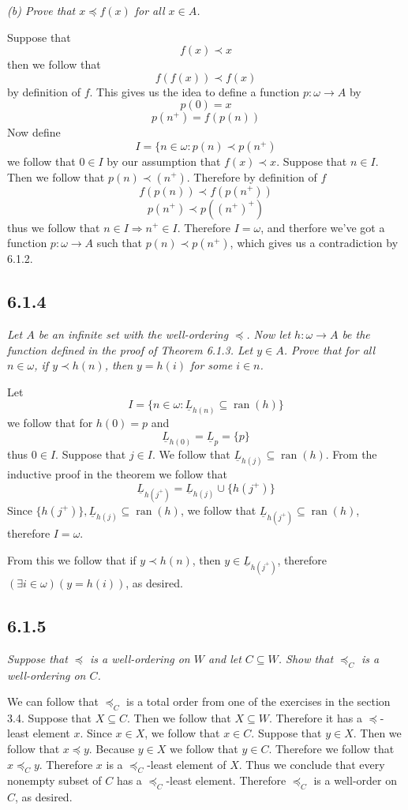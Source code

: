 \documentclass[11pt,oneside,titlepage]{book}
\DeclareMathOperator \ra {\Rightarrow}
\DeclareMathOperator \ran {ran}
\begin{document}
\textit{(b) Prove that $x \preceq f(x)$ for all $x \in A$.}

Suppose that
$$f(x) \prec x$$
then we follow that
$$f(f(x)) \prec f(x)$$
by definition of $f$. This gives us the idea to define a function $p: \omega \to A$ by
$$p(0) = x$$
$$p(n^+) = f(p(n))$$
Now define
$$I = \{n \in \omega: p(n) \prec p(n^+)$$
we follow that $0 \in I$ by our assumption that $f(x) \prec x$. Suppose that
$n \in I$. Then we follow that $p(n) \prec(n^+)$. Therefore by definition of
$f$
$$f(p(n)) \prec f(p(n^+))$$
$$p(n^+) \prec p((n^+)^+)$$
thus we follow that $n \in I \ra n^+ \in I$. Therefore $I = \omega$, and therfore
we've got a function $p: \omega \to A$ such that $p(n) \prec p(n^+)$, which
gives us a contradiction by 6.1.2.

\subsection*{6.1.4}

\textit{Let $A$ be an infinite set with the well-ordering $\preceq$. Now let
  $h: \omega \to A$ be the function defined in the proof of Theorem 6.1.3. Let $y \in A$.
  Prove that for all $n \in \omega$, if $y \prec h(n)$, then $y = h(i)$ for
  some $i \in n$.}

Let
$$I = \{n \in \omega: \underline{L}_{h(n)} \subseteq \ran(h)\}$$
we follow that for $h(0) = p$ and
$$\underline{L}_{h(0)} = \underline{L}_{p} = \{p\}$$
thus $0 \in I$. Suppose that $j \in I$. We follow that $\underline{L}_{h(j)} \subseteq \ran(h)$.
From the inductive proof in the theorem we follow that
$$\underline{L}_{h(j^+)}  = \underline{L}_{h(j)} \cup \{h(j^+)\}$$
Since $\{h(j^+)\}, \underline{L}_{h(j)} \subseteq \ran(h)$,
we follow that $\underline{L}_{h(j^+)} \subseteq \ran(h)$, therefore $I = \omega$.

From this we follow that if $y \prec h(n)$, then $y \in \underline{L}_{h(j^+)}$, therefore
$(\exists i \in \omega)(y = h(i))$, as desired.

\subsection*{6.1.5}

\textit{Suppose that $\preceq$ is a well-ordering on $W$ and let $C \subseteq W$.
  Show that $\preceq_C$ is a well-ordering on $C$.}

We can follow that $\preceq_C$ is a total order from one of the exercises in the
section 3.4. Suppose that $X \subseteq C$. Then we follow that $X \subseteq W$.
Therefore it has a $\preceq$-least element $x$. Since $x \in X$, we follow that
$x \in C$. Suppose that $y \in X$. Then we follow that $x \preceq y$. Because $y \in X$
we follow that $y \in C$. Therefore we follow that $x \preceq_C y$. Therefore
$x$ is a $\preceq_C$-least element of $X$. Thus we conclude that every
nonempty subset of $C$ has a $\preceq_C$-least element. Therefore $\preceq_C$ is a
well-order on $C$, as desired.
\end{document}
